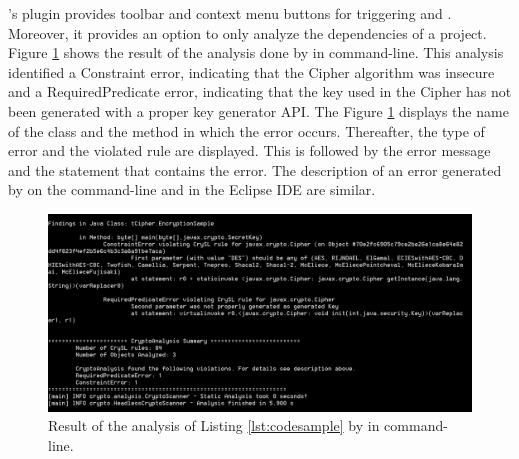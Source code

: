 \cognicrypt's plugin provides toolbar and context menu buttons for triggering \cognicryptsast{} and \cognicryptgen{}. Moreover, it provides an option to only analyze the dependencies of a project. Figure \ref{fig:cccl} shows the result of the analysis done by \cognicryptsast{} in command-line. This analysis identified a Constraint error, indicating that the Cipher algorithm was insecure and a RequiredPredicate error, indicating that the key used in the Cipher has not been generated with a proper key generator API. The Figure \ref{fig:cccl} displays the name of the class and the method in which the error occurs. Thereafter, the type of error and the violated rule are displayed. This is followed by the error message and the statement that contains the error. The description of an error generated by \cognicryptsast{} on the command-line and in the Eclipse IDE are similar. 
\begin{figure}[H]
\centering
\includegraphics[width=1\linewidth]{thesis/figures/CCCommand.PNG}
\caption{Result of the analysis of Listing \ref{lst:codesample} by \cognicryptsast{} in command-line.}
\label{fig:cccl}
\end{figure}

